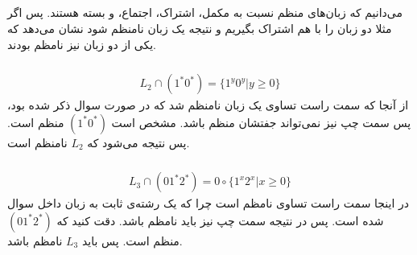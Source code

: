 \subsection{}
می‌دانیم که زبان‌های منظم نسبت به مکمل، اشتراک، اجتماع،
 و 
بسته هستند. پس اگر مثلا دو زبان را با هم اشتراک بگیریم و نتیجه یک زبان نامنظم شود نشان می‌دهد که
یکی از دو زبان نیز نامظم بودند.
\subsubsection{}
\begin{gather*}
    L_2 \cap (1^* 0^*) = \{1^y 0^y | y \ge 0\}
\end{gather*}
از آنجا که سمت راست تساوی یک زبان نامنظم شد که در صورت سوال ذکر شده بود، پس سمت چپ نیز نمی‌تواند جفتشان
منظم باشد. مشخص است
$(1^* 0^*)$
منظم است. پس نتیجه می‌شود که
$L_2$
نامنظم است.
\subsubsection{}
\begin{gather*}
    L_3 \cap (0 1^* 2^*) = 0 \circ \{1^x 2^x | x \ge 0\}
\end{gather*}
در اینجا سمت راست تساوی نامظم است چرا که یک رشته‌ی ثابت به زبان داخل سوال
شده است. پس در نتیجه سمت چپ نیز باید نامظم باشد. دقت کنید که 
$(0 1^* 2^*)$
منظم است. پس باید
$L_3$
نامظم باشد.